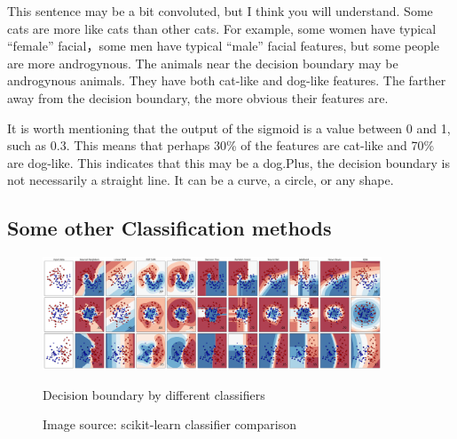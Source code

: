 \documentclass[oneside]{book}
\begin{document}
This sentence may be a bit convoluted, but I think you will understand. Some cats are more like cats than other cats.
For example, some women have typical “female” facial，some men have typical “male” facial features, but some people are more androgynous.
The animals near the decision boundary may be androgynous animals. They have both cat-like and dog-like features.
The farther away from the decision boundary, the more obvious their features are. 

It is worth mentioning that the output of the sigmoid is a value between 0 and 1, such as 0.3. This means that perhaps 30\% of the features are cat-like and 70\% are dog-like.
This indicates that this may be a dog.Plus, the decision boundary is not necessarily a straight line. It can be a curve, a circle, or any shape.

\subsection{Some other Classification methods}
\begin{figure}[H]
        \centering
        \includegraphics[width=0.9\textwidth]{images/classifier.png}
        \caption{Decision boundary by different classifiers}
        \caption*{Image source: scikit-learn classifier comparison}
\end{figure}
\end{document}
